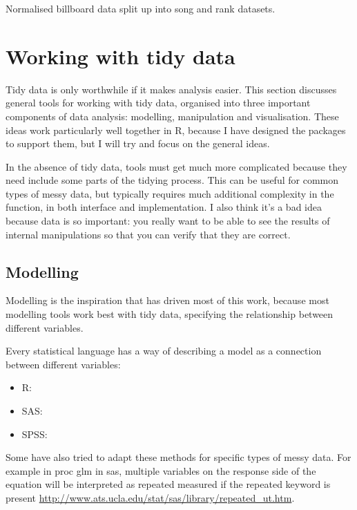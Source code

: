 \documentclass[oneside]{article}
\begin{document}
\begin{table}
  \centering
  
  

  \caption{Normalised billboard data split up into song and rank datasets.}
  \label{tbl:billboard-normal}
\end{table}

\section{Working with tidy data}

Tidy data is only worthwhile if it makes analysis easier. This section discusses general tools for working with tidy data, organised into three important components of data analysis: modelling, manipulation and visualisation. These ideas work particularly well together in R, because I have designed the packages to support them, but I will try and focus on the general ideas. 

In the absence of tidy data, tools must get much more complicated because they need include some parts of the tidying process. This can be useful for common types of messy data, but typically requires much additional complexity in the function, in both interface and implementation. I also think it's a bad idea because data is so important: you really want to be able to see the results of internal manipulations so that you can verify that they are correct.

\subsection{Modelling}

Modelling is the inspiration that has driven most of this work, because most modelling tools work best with tidy data, specifying the relationship between different variables. 

Every statistical language has a way of describing a model as a connection between different variables:

\begin{itemize}

\item R:
\item SAS:
\item SPSS:
\end{itemize}

Some have also tried to adapt these methods for specific types of messy data. For example in {\sc proc glm} in {\sc sas}, multiple variables on the response side of the equation will be interpreted as repeated measured if the {\sc repeated} keyword is present \url{http://www.ats.ucla.edu/stat/sas/library/repeated_ut.htm}.
\end{document}
